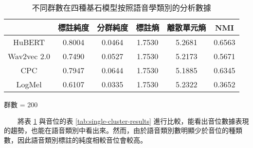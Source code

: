 \begin{table}[!htbp]
    \begin{subtable}[t]{\textwidth}
        \centering
        \begin{tabular}{|c|c|c|c|c|c|} \hline
                        & 標註純度   & 分群純度   & 標註熵    & 離散單元熵  & NMI    \\ \hline
            HuBERT      & 0.8004 & 0.0464 & 1.7530 & 5.2681 & 0.6563 \\ \hline    %
            Wav2vec 2.0 & 0.7490 & 0.0527 & 1.7530 & 5.2173 & 0.5671 \\ \hline    %
            CPC         & 0.7947 & 0.0644 & 1.7530 & 5.1885 & 0.6345 \\ \hline    %
            LogMel      & 0.6107 & 0.0335 & 1.7530 & 5.2322 & 0.3652 \\ \hline    %
        \end{tabular}
        \caption{群數 = 200}
        \label{tab:ch3-clu200-pcls}
    \end{subtable}

    \caption{不同群數在四種基石模型按照語音學類別的分析數據}
    \label{tab:single-cluster-phonetype-results}
\end{table}
　　將表 \ref{tab:single-cluster-phonetype-results} 與音位的表 \ref{tab:single-cluster-results} 進行比較，能看出音位數據表現的趨勢，也能在語音類別中看出來。然而，由於語音類別數明顯少於音位的種類數，因此語音類別標註的純度相較音位會較高。

\setcounter{section}{4}
